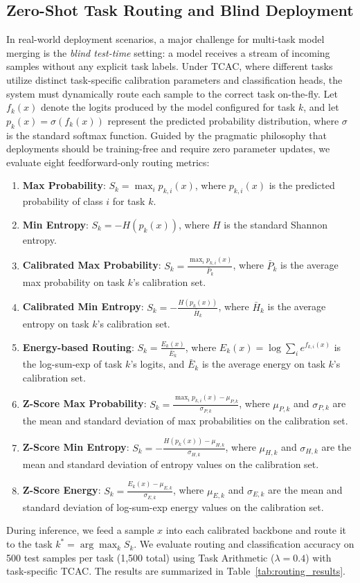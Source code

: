 \documentclass{article}
\theoremstyle{plain}
\theoremstyle{definition}
\theoremstyle{remark}
\begin{document}
\subsection{Zero-Shot Task Routing and Blind Deployment}
\label{sec:routing}
In real-world deployment scenarios, a major challenge for multi-task model merging is the \textit{blind test-time} setting: a model receives a stream of incoming samples without any explicit task labels. Under TCAC, where different tasks utilize distinct task-specific calibration parameters and classification heads, the system must dynamically route each sample to the correct task on-the-fly. Let $f_k(x)$ denote the logits produced by the model configured for task $k$, and let $p_k(x) = \sigma(f_k(x))$ represent the predicted probability distribution, where $\sigma$ is the standard softmax function. Guided by the pragmatic philosophy that deployments should be training-free and require zero parameter updates, we evaluate eight feedforward-only routing metrics:
\begin{enumerate}
    \item \textbf{Max Probability}: $S_k = \max_i p_{k, i}(x)$, where $p_{k, i}(x)$ is the predicted probability of class $i$ for task $k$.
    \item \textbf{Min Entropy}: $S_k = -H(p_k(x))$, where $H$ is the standard Shannon entropy.
    \item \textbf{Calibrated Max Probability}: $S_k = \frac{\max_i p_{k, i}(x)}{\bar{P}_k}$, where $\bar{P}_k$ is the average max probability on task $k$'s calibration set.
    \item \textbf{Calibrated Min Entropy}: $S_k = -\frac{H(p_k(x))}{\bar{H}_k}$, where $\bar{H}_k$ is the average entropy on task $k$'s calibration set.
    \item \textbf{Energy-based Routing}: $S_k = \frac{E_k(x)}{\bar{E}_k}$, where $E_k(x) = \log \sum_i e^{f_{k, i}(x)}$ is the log-sum-exp of task $k$'s logits, and $\bar{E}_k$ is the average energy on task $k$'s calibration set.
    \item \textbf{Z-Score Max Probability}: $S_k = \frac{\max_i p_{k, i}(x) - \mu_{P, k}}{\sigma_{P, k}}$, where $\mu_{P, k}$ and $\sigma_{P, k}$ are the mean and standard deviation of max probabilities on the calibration set.
    \item \textbf{Z-Score Min Entropy}: $S_k = -\frac{H(p_k(x)) - \mu_{H, k}}{\sigma_{H, k}}$, where $\mu_{H, k}$ and $\sigma_{H, k}$ are the mean and standard deviation of entropy values on the calibration set.
    \item \textbf{Z-Score Energy}: $S_k = \frac{E_k(x) - \mu_{E, k}}{\sigma_{E, k}}$, where $\mu_{E, k}$ and $\sigma_{E, k}$ are the mean and standard deviation of log-sum-exp energy values on the calibration set.
\end{enumerate}
During inference, we feed a sample $x$ into each calibrated backbone and route it to the task $k^* = \arg\max_k S_k$. We evaluate routing and classification accuracy on 500 test samples per task (1,500 total) using Task Arithmetic ($\lambda=0.4$) with task-specific TCAC. The results are summarized in Table~\ref{tab:routing_results}.
\end{document}

